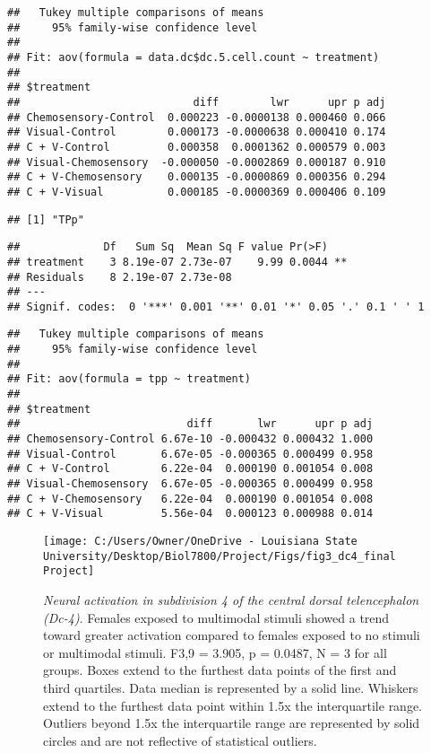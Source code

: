 \documentclass[
  12pt,
]{article}
\begin{document}
\begin{verbatim}
##   Tukey multiple comparisons of means
##     95% family-wise confidence level
## 
## Fit: aov(formula = data.dc$dc.5.cell.count ~ treatment)
## 
## $treatment
##                           diff        lwr      upr p adj
## Chemosensory-Control  0.000223 -0.0000138 0.000460 0.066
## Visual-Control        0.000173 -0.0000638 0.000410 0.174
## C + V-Control         0.000358  0.0001362 0.000579 0.003
## Visual-Chemosensory  -0.000050 -0.0002869 0.000187 0.910
## C + V-Chemosensory    0.000135 -0.0000869 0.000356 0.294
## C + V-Visual          0.000185 -0.0000369 0.000406 0.109
\end{verbatim}

\begin{verbatim}
## [1] "TPp"
\end{verbatim}

\begin{verbatim}
##             Df   Sum Sq  Mean Sq F value Pr(>F)   
## treatment    3 8.19e-07 2.73e-07    9.99 0.0044 **
## Residuals    8 2.19e-07 2.73e-08                  
## ---
## Signif. codes:  0 '***' 0.001 '**' 0.01 '*' 0.05 '.' 0.1 ' ' 1
\end{verbatim}

\begin{verbatim}
##   Tukey multiple comparisons of means
##     95% family-wise confidence level
## 
## Fit: aov(formula = tpp ~ treatment)
## 
## $treatment
##                          diff       lwr      upr p adj
## Chemosensory-Control 6.67e-10 -0.000432 0.000432 1.000
## Visual-Control       6.67e-05 -0.000365 0.000499 0.958
## C + V-Control        6.22e-04  0.000190 0.001054 0.008
## Visual-Chemosensory  6.67e-05 -0.000365 0.000499 0.958
## C + V-Chemosensory   6.22e-04  0.000190 0.001054 0.008
## C + V-Visual         5.56e-04  0.000123 0.000988 0.014
\end{verbatim}



\begin{figure}[H]

{\centering \texttt{[image: C:/Users/Owner/OneDrive - Louisiana State University/Desktop/Biol7800/Project/Figs/fig3\_dc4\_final Project]} 

}

\caption{\emph{Neural activation in subdivision 4 of the central dorsal telencephalon (Dc-4)}. Females exposed to multimodal stimuli showed a trend toward greater activation compared to females exposed to no stimuli or multimodal stimuli. F3,9 = 3.905, p = 0.0487, N = 3 for all groups. Boxes extend to the furthest data points of the first and third quartiles. Data median is represented by a solid line. Whiskers extend to the furthest data point within 1.5x the interquartile range. Outliers beyond 1.5x the interquartile range are represented by solid circles and are not reflective of statistical outliers.}\label{fig:fig3}
\end{figure}
\end{document}
